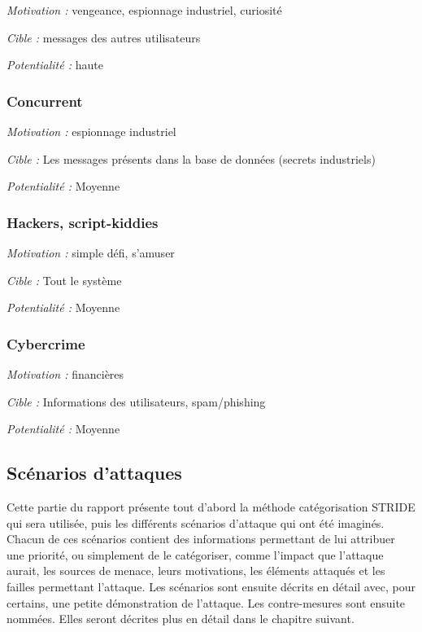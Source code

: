 \documentclass{article}
\begin{document}
\textit{Motivation :} vengeance, espionnage industriel, curiosité

\textit{Cible :} messages des autres utilisateurs

\textit{Potentialité :} haute

\subsubsection{Concurrent}

\textit{Motivation :} espionnage industriel

\textit{Cible :} Les messages présents dans la base de données (secrets
industriels)

\textit{Potentialité :} Moyenne

\subsubsection{Hackers, script-kiddies}

\textit{Motivation :} simple défi, s'amuser

\textit{Cible :} Tout le système

\textit{Potentialité :} Moyenne

\subsubsection{Cybercrime}

\textit{Motivation :} financières

\textit{Cible :} Informations des utilisateurs, spam/phishing

\textit{Potentialité :} Moyenne

\subsection{Scénarios d'attaques}

Cette partie du rapport présente tout d'abord la méthode catégorisation
STRIDE qui sera utilisée, puis les différents scénarios d'attaque qui
ont été imaginés. Chacun de ces scénarios contient des informations
permettant de lui attribuer une priorité, ou simplement de le
catégoriser, comme l'impact que l'attaque aurait, les sources de menace,
leurs motivations, les éléments attaqués et les failles permettant
l'attaque. Les scénarios sont ensuite décrits en détail avec, pour
certains, une petite démonstration de l'attaque. Les contre-mesures sont
ensuite nommées. Elles seront décrites plus en détail dans le chapitre
suivant.
\end{document}
